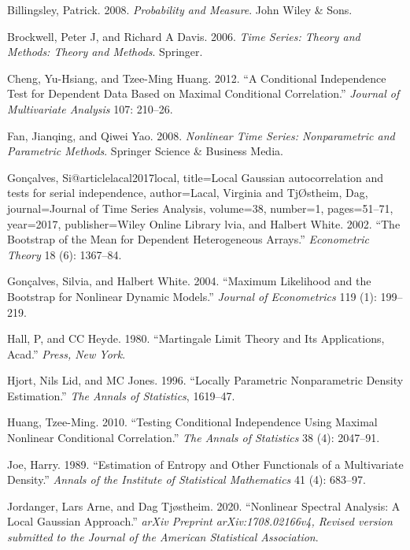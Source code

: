 \documentclass[
  12pt,
  letterpaper]{article}
\numberwithin{equation}{section}
\begin{document}
\leavevmode\hypertarget{ref-bill:2008}{}%
Billingsley, Patrick. 2008. \emph{Probability and Measure}. John Wiley \& Sons.

\leavevmode\hypertarget{ref-brockwell1991time}{}%
Brockwell, Peter J, and Richard A Davis. 2006. \emph{Time Series: Theory and Methods: Theory and Methods}. Springer.

\leavevmode\hypertarget{ref-cheng2012conditional}{}%
Cheng, Yu-Hsiang, and Tzee-Ming Huang. 2012. ``A Conditional Independence Test for Dependent Data Based on Maximal Conditional Correlation.'' \emph{Journal of Multivariate Analysis} 107: 210--26.

\leavevmode\hypertarget{ref-fan2008nonlinear}{}%
Fan, Jianqing, and Qiwei Yao. 2008. \emph{Nonlinear Time Series: Nonparametric and Parametric Methods}. Springer Science \& Business Media.

\leavevmode\hypertarget{ref-gonccalves2002bootstrap}{}%
Gonçalves, Si@articlelacal2017local, title=Local Gaussian autocorrelation and tests for serial independence, author=Lacal, Virginia and TjØstheim, Dag, journal=Journal of Time Series Analysis, volume=38, number=1, pages=51--71, year=2017, publisher=Wiley Online Library lvia, and Halbert White. 2002. ``The Bootstrap of the Mean for Dependent Heterogeneous Arrays.'' \emph{Econometric Theory} 18 (6): 1367--84.

\leavevmode\hypertarget{ref-gonccalves2004maximum}{}%
Gonçalves, Silvia, and Halbert White. 2004. ``Maximum Likelihood and the Bootstrap for Nonlinear Dynamic Models.'' \emph{Journal of Econometrics} 119 (1): 199--219.

\leavevmode\hypertarget{ref-hall1980martingale}{}%
Hall, P, and CC Heyde. 1980. ``Martingale Limit Theory and Its Applications, Acad.'' \emph{Press, New York}.

\leavevmode\hypertarget{ref-hjort1996locally}{}%
Hjort, Nils Lid, and MC Jones. 1996. ``Locally Parametric Nonparametric Density Estimation.'' \emph{The Annals of Statistics}, 1619--47.

\leavevmode\hypertarget{ref-huang2010testing}{}%
Huang, Tzee-Ming. 2010. ``Testing Conditional Independence Using Maximal Nonlinear Conditional Correlation.'' \emph{The Annals of Statistics} 38 (4): 2047--91.

\leavevmode\hypertarget{ref-joe1989estimation}{}%
Joe, Harry. 1989. ``Estimation of Entropy and Other Functionals of a Multivariate Density.'' \emph{Annals of the Institute of Statistical Mathematics} 41 (4): 683--97.

\leavevmode\hypertarget{ref-jordanger2017nonlinear}{}%
Jordanger, Lars Arne, and Dag Tjøstheim. 2020. ``Nonlinear Spectral Analysis: A Local Gaussian Approach.'' \emph{arXiv Preprint arXiv:1708.02166v4, Revised version submitted to the Journal of the American Statistical Association}.
\end{document}
